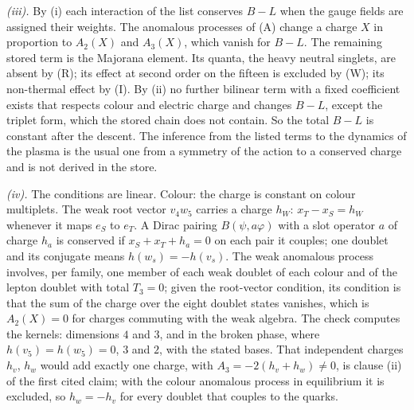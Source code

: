 \emph{(iii).} By (i) each interaction of the list conserves $B - L$ when the gauge fields are assigned their weights. The anomalous processes of (A) change a charge $X$ in proportion to $A_{2}(X)$ and $A_{3}(X)$, which vanish for $B - L$. The remaining stored term is the Majorana element. Its quanta, the heavy neutral singlets, are absent by (R); its effect at second order on the fifteen is excluded by (W); its non-thermal effect by (I). By (ii) no further bilinear term with a fixed coefficient exists that respects colour and electric charge and changes $B - L$, except the triplet form, which the stored chain does not contain. So the total $B - L$ is constant after the descent. The inference from the listed terms to the dynamics of the plasma is the usual one from a symmetry of the action to a conserved charge and is not derived in the store.

\emph{(iv).} The conditions are linear. Colour: the charge is constant on colour multiplets. The weak root vector $v_{4}w_{5}$ carries a charge $h_{W}$: $x_{T} - x_{S} = h_{W}$ whenever it maps $e_{S}$ to $e_{T}$. A Dirac pairing $B(\psi, a\varphi)$ with a slot operator $a$ of charge $h_{a}$ is conserved if $x_{S} + x_{T} + h_{a} = 0$ on each pair it couples; one doublet and its conjugate means $h(w_{s}) = -h(v_{s})$. The weak anomalous process involves, per family, one member of each weak doublet of each colour and of the lepton doublet with total $T_{3} = 0$; given the root-vector condition, its condition is that the sum of the charge over the eight doublet states vanishes, which is $A_{2}(X) = 0$ for charges commuting with the weak algebra. The check computes the kernels: dimensions $4$ and $3$, and in the broken phase, where $h(v_{5}) = h(w_{5}) = 0$, $3$ and $2$, with the stated bases. That independent charges $h_{v}$, $h_{w}$ would add exactly one charge, with $A_{3} = -2(h_{v} + h_{w}) \neq 0$, is clause (ii) of the first cited claim; with the colour anomalous process in equilibrium it is excluded, so $h_{w} = -h_{v}$ for every doublet that couples to the quarks.

